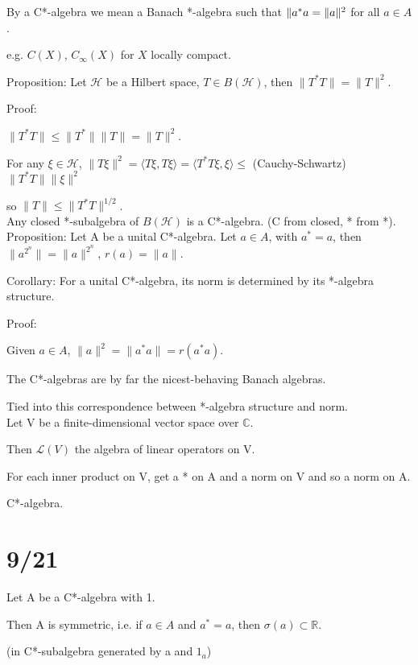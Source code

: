 \documentclass[12pt]{article}
\begin{document}
\noindent
By a C*-algebra we mean a Banach *-algebra such that $\|a^*a\\ = \|a\|^2$ for all $a \in A$.

e.g. $C(X)$, $C_\infty(X)$ for $X$ locally compact.

\noindent
Proposition: Let $\mathcal{H}$ be a Hilbert space, $T \in B(\mathcal{H})$, then $\|T^*T\| = \|T\|^2$.

\noindent
Proof:

$\|T^*T\| \leq \|T^*\|\|T\| = \|T\|^2$.

For any $\xi \in \mathcal{H}$, $\|T\xi\|^2 = \langle T\xi, T\xi \rangle = \langle T^*T\xi, \xi \rangle \leq$ (Cauchy-Schwartz) $\|T^*T\|\|\xi\|^2$

so $\|T\| \leq \|T^*T\|^{1\slash{2}}$.\\

\noindent
Any closed *-subalgebra of $B(\mathcal{H})$ is a C*-algebra. (C from closed, * from *).\\

\noindent
Proposition: Let A be a unital C*-algebra.  Let $a \in A$, with $a^* = a$, then $\|a^{2^n}\| = \|a\|^{2^n}$, $r(a) = \|a\|$.

\noindent
Corollary: For a unital C*-algebra, its norm is determined by its *-algebra structure.

\noindent
Proof:

Given $a \in A$, $\|a\|^2 = \|a^*a\| = r(a^*a)$.

\noindent
The C*-algebras are by far the nicest-behaving Banach algebras.

Tied into this correspondence between *-algebra structure and norm.\\

\noindent
Let V be a finite-dimensional vector space over $\mathds{C}$.

Then $\mathcal{L}(V)$ the algebra of linear operators on V.

For each inner product on V, get a * on A and a norm on V and so a norm on A.

C*-algebra.

\section{9/21}

Let A be a C*-algebra with 1.

Then A is symmetric, i.e. if $a \in A$ and $a^* = a$, then $\sigma(a) \subset \mathds{R}$.

(in C*-subalgebra generated by a and $1_a$)
\end{document}
